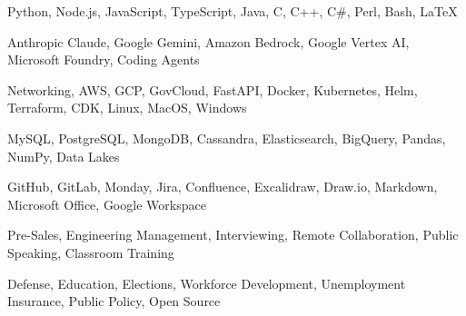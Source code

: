   {Python, Node.js, JavaScript, TypeScript, Java, C, C++, C\#, Perl, Bash, LaTeX}

  {Anthropic Claude, Google Gemini, Amazon Bedrock, Google Vertex AI, Microsoft Foundry, Coding Agents}

  {Networking, AWS, GCP, GovCloud, FastAPI, Docker, Kubernetes, Helm, Terraform, CDK, Linux, MacOS, Windows}

  {MySQL, PostgreSQL, MongoDB, Cassandra, Elasticsearch, BigQuery, Pandas, NumPy, Data Lakes}

  {GitHub, GitLab, Monday, Jira, Confluence, Excalidraw, Draw.io, Markdown, Microsoft Office, Google Workspace}

  {Pre-Sales, Engineering Management, Interviewing, Remote Collaboration, Public Speaking, Classroom Training}

  {Defense, Education, Elections, Workforce Development, Unemployment Insurance, Public Policy, Open Source}
